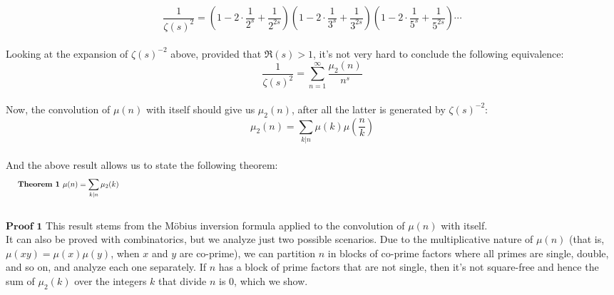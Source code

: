 \documentclass[12pt]{article}
\newenvironment{eqleft}
 {\begin{equation}\hspace{0pt}}
 {\hspace{650pt minus 1fil}\end{equation}
\ignorespacesafterend}
\begin{document}
\begin{equation} \label{eq:euler_prod^2_2} \nonumber
\frac{1}{\zeta(s)^2}=\left(1-2\cdot\frac{1}{2^s}+\frac{1}{2^{2s}}\right)\left(1-2\cdot\frac{1}{3^s}+\frac{1}{3^{2s}}\right)\left(1-2\cdot\frac{1}{5^s}+\frac{1}{5^{2s}}\right)\cdots 
\end{equation}\\
\indent Looking at the expansion of $\zeta(s)^{-2}$ above, provided that $\Re{(s)}>1$, it's not very hard to conclude the following equivalence:
\begin{equation} \label{eq:euler_prod3}
\frac{1}{\zeta(s)^2}=\sum_{n=1}^{\infty}\frac{\mu_{2}(n)}{n^{s}}
\end{equation}\\
\indent Now, the convolution of $\mu(n)$ with itself should give us $\mu_2(n)$, after all the latter is generated by $\zeta(s)^{-2}$: 
\begin{equation} \label{eq:theo1_new} \nonumber
\mu_{2}(n)=\sum_{k|n}\mu(k)\mu\left(\frac{n}{k}\right) 
\end{equation}\\
\indent And the above result allows us to state the following theorem:
\begin{eqleft} \label{eq:theo1} \nonumber
\indent \textbf{Theorem 1 } \mu(n)=\sum_{k|n}\mu_{2}(k) 
\end{eqleft}\\
\indent $\textbf{Proof 1}$ This result stems from the M\"{o}bius inversion formula applied to the convolution of $\mu(n)$ with itself.\\

It can also be proved with combinatorics, but we analyze just two possible scenarios. Due to the multiplicative nature of $\mu(n)$ (that is, $\mu(x y)=\mu(x)\mu(y)$, when $x$ and $y$ are co-prime), we can partition $n$ in blocks of co-prime factors where all primes are single, double, and so on, and analyze each one separately. If $n$ has a block of prime factors that are not single, then it's not square-free and hence the sum of $\mu_{2}(k)$ over the integers $k$ that divide $n$ is 0, which we show.\\
\end{document}
